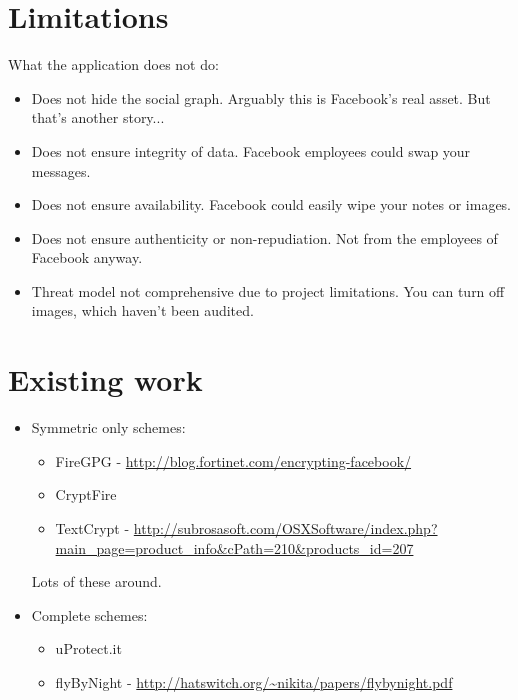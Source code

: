 \section{Limitations}

What the application does not do:
\begin{itemize}
    \item Does not hide the social graph. Arguably this is Facebook's real asset. But that's another story...
    \item Does not ensure integrity of data. Facebook employees could swap your messages.
    \item Does not ensure availability. Facebook could easily wipe your notes or images.
    \item Does not ensure authenticity or non-repudiation. Not from the employees of Facebook anyway.
    \item Threat model not comprehensive due to project limitations. You can turn off images, which haven't been audited.
\end{itemize}


\section{Existing work}
\begin{itemize}
    \item Symmetric only schemes:
    
    \begin{itemize}
        \item FireGPG - \url{http://blog.fortinet.com/encrypting-facebook/}
        \item CryptFire
        \item TextCrypt - \url{http://subrosasoft.com/OSXSoftware/index.php?main_page=product_info&cPath=210&products_id=207}
    \end{itemize}
    
    Lots of these around.
    
    \item Complete schemes:
    
    \begin{itemize}
        \item uProtect.it
        \item flyByNight - \url{http://hatswitch.org/~nikita/papers/flybynight.pdf}
    \end{itemize}
\end{itemize}




